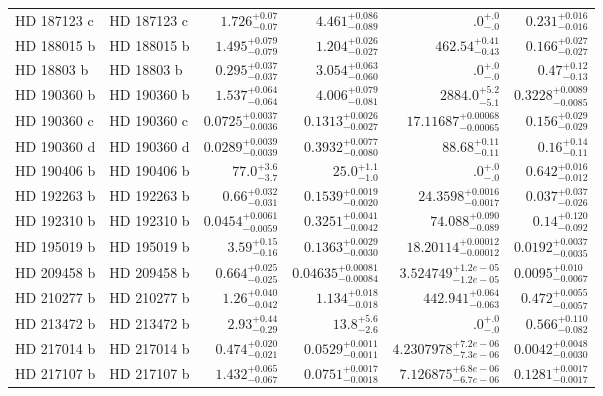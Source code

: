 \begin{longtable*}{llrrrr}
HD 187123 c & HD 187123 c & $1.726^{+0.07}_{-0.07}$ & $4.461^{+0.086}_{-0.089}$ & $.0^{+.0}_{-.0}$ & $0.231^{+0.016}_{-0.016}$ \\ 
HD 188015 b & HD 188015 b & $1.495^{+0.079}_{-0.079}$ & $1.204^{+0.026}_{-0.027}$ & $462.54^{+0.41}_{-0.43}$ & $0.166^{+0.027}_{-0.027}$ \\ 
HD 18803 b & HD 18803 b & $0.295^{+0.037}_{-0.037}$ & $3.054^{+0.063}_{-0.060}$ & $.0^{+.0}_{-.0}$ & $0.47^{+0.12}_{-0.13}$ \\ 
HD 190360 b & HD 190360 b & $1.537^{+0.064}_{-0.064}$ & $4.006^{+0.079}_{-0.081}$ & $2884.0^{+5.2}_{-5.1}$ & $0.3228^{+0.0089}_{-0.0085}$ \\ 
HD 190360 c & HD 190360 c & $0.0725^{+0.0037}_{-0.0036}$ & $0.1313^{+0.0026}_{-0.0027}$ & $17.11687^{+0.00068}_{-0.00065}$ & $0.156^{+0.029}_{-0.029}$ \\ 
HD 190360 d & HD 190360 d & $0.0289^{+0.0039}_{-0.0039}$ & $0.3932^{+0.0077}_{-0.0080}$ & $88.68^{+0.11}_{-0.11}$ & $0.16^{+0.14}_{-0.11}$ \\ 
HD 190406 b & HD 190406 b & $77.0^{+3.6}_{-3.7}$ & $25.0^{+1.1}_{-1.0}$ & $.0^{+.0}_{-.0}$ & $0.642^{+0.016}_{-0.012}$ \\ 
HD 192263 b & HD 192263 b & $0.66^{+0.032}_{-0.031}$ & $0.1539^{+0.0019}_{-0.0020}$ & $24.3598^{+0.0016}_{-0.0017}$ & $0.037^{+0.037}_{-0.026}$ \\ 
HD 192310 b & HD 192310 b & $0.0454^{+0.0061}_{-0.0059}$ & $0.3251^{+0.0041}_{-0.0042}$ & $74.088^{+0.090}_{-0.089}$ & $0.14^{+0.120}_{-0.092}$ \\ 
HD 195019 b & HD 195019 b & $3.59^{+0.15}_{-0.16}$ & $0.1363^{+0.0029}_{-0.0030}$ & $18.20114^{+0.00012}_{-0.00012}$ & $0.0192^{+0.0037}_{-0.0035}$ \\ 
HD 209458 b & HD 209458 b & $0.664^{+0.025}_{-0.025}$ & $0.04635^{+0.00081}_{-0.00084}$ & $3.524749^{+1.2e-05}_{-1.2e-05}$ & $0.0095^{+0.010}_{-0.0067}$ \\ 
HD 210277 b & HD 210277 b & $1.26^{+0.040}_{-0.042}$ & $1.134^{+0.018}_{-0.018}$ & $442.941^{+0.064}_{-0.063}$ & $0.472^{+0.0055}_{-0.0057}$ \\ 
HD 213472 b & HD 213472 b & $2.93^{+0.44}_{-0.29}$ & $13.8^{+5.6}_{-2.6}$ & $.0^{+.0}_{-.0}$ & $0.566^{+0.110}_{-0.082}$ \\ 
HD 217014 b & HD 217014 b & $0.474^{+0.020}_{-0.021}$ & $0.0529^{+0.0011}_{-0.0011}$ & $4.2307978^{+7.2e-06}_{-7.3e-06}$ & $0.0042^{+0.0048}_{-0.0030}$ \\ 
HD 217107 b & HD 217107 b & $1.432^{+0.065}_{-0.067}$ & $0.0751^{+0.0017}_{-0.0018}$ & $7.126875^{+6.8e-06}_{-6.7e-06}$ & $0.1281^{+0.0017}_{-0.0017}$ \\ 

\end{longtable*}
